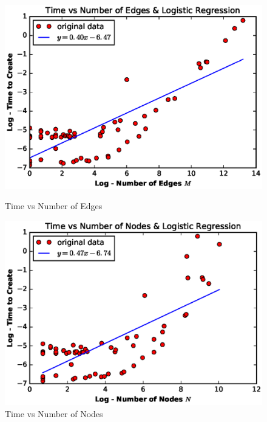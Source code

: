 \begin{figure}[h]
	\begin{minipage}{0.51\textwidth}
		\includegraphics[width=\textwidth]{Graphics/TimeVsEdges.eps}
        \caption{Time vs Number of Edges}
        \label{fig:TimeVsEdges}
	\end{minipage}
	\begin{minipage}{0.51\textwidth}
		\flushleft
		\includegraphics[width=\textwidth]{Graphics/TimeVsNodes.eps}
        \caption{Time vs Number of Nodes}
		\label{fig:TimeVsNodes}
	\end{minipage}
\end{figure}

